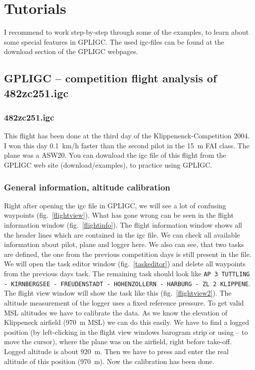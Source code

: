 
\section{Tutorials}

I recommend to work step-by-step through some of the examples, to learn about some special features in GPLIGC.
The used igc-files can be found at the download section of the GPLIGC webpages.

\subsection{GPLIGC -- competition flight analysis  of 482zc251.igc}

\subsubsection{482zc251.igc}
This flight has been done at the third day of the Klippenenck-Competition 2004.
I won this day 0.1~km/h faster than the second pilot in the 15~m FAI class. The plane was a ASW20.
You can download the igc file of this flight from the GPLIGC web site (download/examples), to practice using GPLIGC.

\subsubsection{General information, altitude calibration}
Right after opening the igc file in GPLIGC, we will see a lot of confusing waypoints (fig.~\ref{flightview}).
What has gone wrong can be seen in the flight information window (fig.~\ref{flightinfo}).
The flight information window shows all the header lines which are contained in the igc file.
We can check all available information about pilot, plane and logger here.
We also can see, that two tasks are defined, the one from the previous competition days is still present in the file.
We will open the task editor window (fig.~\ref{taskeditor}) and delete all waypoints from the previous days task.
The remaining task should look like \texttt{AP 3 TUTTLING - KIRNBERGSEE - FREUDENSTADT - HOHENZOLLERN - HARBURG - ZL 2 KLIPPENE}.
The flight view window will show the task like this (fig.~\ref{flightview2}).
The altitude measurement of the logger uses a fixed reference pressure.
To get valid MSL altitudes we have to calibrate the data.
As we know the elevation of Klippeneck airfield (970~m MSL) we can do this easily.
We have to find a logged position (by left-clicking in the flight view windows barogram strip or using -- to move the cursor),
where the plane was on the airfield, right before take-off. Logged altitude is about 920~m.
Then we have to press  and enter the real altitude of this position (970~m).
Now the calibration has been done.


